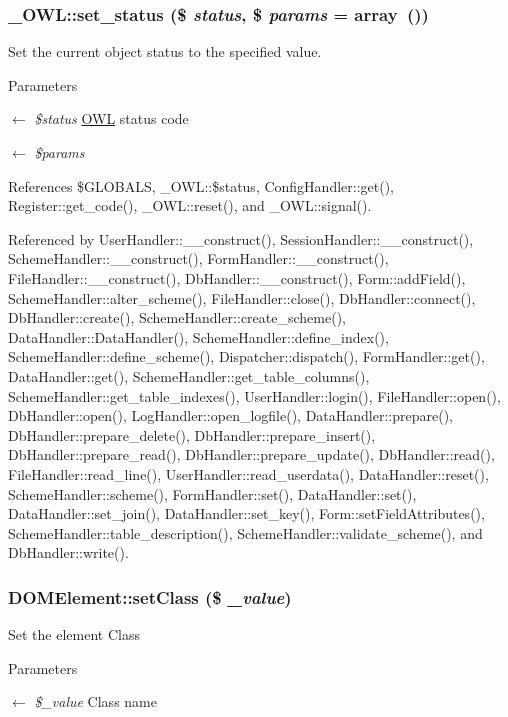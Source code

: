 \subsubsection[{set\_\-status}]{\setlength{\rightskip}{0pt plus 5cm}\_\-OWL::set\_\-status (\$ {\em status}, \/  \$ {\em params} = {\ttfamily array~()})}\label{class__OWL_aea912d0ede9b3c2a69b79072d94d4787}
Set the current object status to the specified value.


\begin{DoxyParams}{Parameters}
\item[\mbox{$\leftarrow$} {\em \$status}]\hyperlink{classOWL}{OWL} status code \item[\mbox{$\leftarrow$} {\em \$params}]\end{DoxyParams}


References \$GLOBALS, \_\-OWL::\$status, ConfigHandler::get(), Register::get\_\-code(), \_\-OWL::reset(), and \_\-OWL::signal().



Referenced by UserHandler::\_\-\_\-construct(), SessionHandler::\_\-\_\-construct(), SchemeHandler::\_\-\_\-construct(), FormHandler::\_\-\_\-construct(), FileHandler::\_\-\_\-construct(), DbHandler::\_\-\_\-construct(), Form::addField(), SchemeHandler::alter\_\-scheme(), FileHandler::close(), DbHandler::connect(), DbHandler::create(), SchemeHandler::create\_\-scheme(), DataHandler::DataHandler(), SchemeHandler::define\_\-index(), SchemeHandler::define\_\-scheme(), Dispatcher::dispatch(), FormHandler::get(), DataHandler::get(), SchemeHandler::get\_\-table\_\-columns(), SchemeHandler::get\_\-table\_\-indexes(), UserHandler::login(), FileHandler::open(), DbHandler::open(), LogHandler::open\_\-logfile(), DataHandler::prepare(), DbHandler::prepare\_\-delete(), DbHandler::prepare\_\-insert(), DbHandler::prepare\_\-read(), DbHandler::prepare\_\-update(), DbHandler::read(), FileHandler::read\_\-line(), UserHandler::read\_\-userdata(), DataHandler::reset(), SchemeHandler::scheme(), FormHandler::set(), DataHandler::set(), DataHandler::set\_\-join(), DataHandler::set\_\-key(), Form::setFieldAttributes(), SchemeHandler::table\_\-description(), SchemeHandler::validate\_\-scheme(), and DbHandler::write().

\subsubsection[{setClass}]{\setlength{\rightskip}{0pt plus 5cm}DOMElement::setClass (\$ {\em \_\-value})}\label{classDOMElement_a593e89f31f6c1050d3948b29b00f387a}
Set the element Class 
\begin{DoxyParams}{Parameters}
\item[\mbox{$\leftarrow$} {\em \$\_\-value}]Class name \end{DoxyParams}
